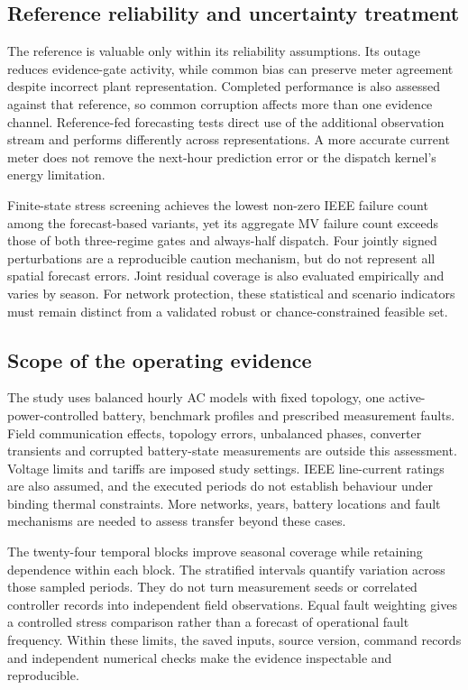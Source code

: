 \documentclass[preprint,12pt]{elsarticle}
\begin{document}
\subsection{Reference reliability and uncertainty treatment}
The reference is valuable only within its reliability assumptions. Its outage reduces evidence-gate activity, while common bias can preserve meter agreement despite incorrect plant representation. Completed performance is also assessed against that reference, so common corruption affects more than one evidence channel. Reference-fed forecasting tests direct use of the additional observation stream and performs differently across representations. A more accurate current meter does not remove the next-hour prediction error or the dispatch kernel's energy limitation.

Finite-state stress screening achieves the lowest non-zero IEEE failure count among the forecast-based variants, yet its aggregate MV failure count exceeds those of both three-regime gates and always-half dispatch. Four jointly signed perturbations are a reproducible caution mechanism, but do not represent all spatial forecast errors. Joint residual coverage is also evaluated empirically and varies by season. For network protection, these statistical and scenario indicators must remain distinct from a validated robust or chance-constrained feasible set.

\subsection{Scope of the operating evidence}
The study uses balanced hourly AC models with fixed topology, one active-power-controlled battery, benchmark profiles and prescribed measurement faults. Field communication effects, topology errors, unbalanced phases, converter transients and corrupted battery-state measurements are outside this assessment. Voltage limits and tariffs are imposed study settings. IEEE line-current ratings are also assumed, and the executed periods do not establish behaviour under binding thermal constraints. More networks, years, battery locations and fault mechanisms are needed to assess transfer beyond these cases.

The twenty-four temporal blocks improve seasonal coverage while retaining dependence within each block. The stratified intervals quantify variation across those sampled periods. They do not turn measurement seeds or correlated controller records into independent field observations. Equal fault weighting gives a controlled stress comparison rather than a forecast of operational fault frequency. Within these limits, the saved inputs, source version, command records and independent numerical checks make the evidence inspectable and reproducible.
\end{document}
